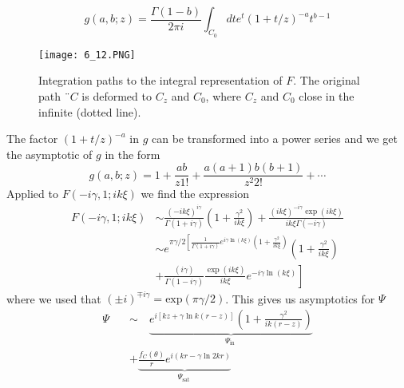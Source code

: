 \begin{equation}
    g(a, b ; z)=\frac{\Gamma(1-b)}{2 \pi i} \int_{C_{0}} d t e^{t}(1+t / z)^{-a} t^{b-1}
    \end{equation}
\begin{figure}[ht]
    \begin{minipage}{0.6\textwidth}
        \centering
        \texttt{[image: 6\_12.PNG]}
    \end{minipage}
    \begin{minipage}{0.4\textwidth}
        \caption{Integration paths to the integral representation of $F$. The original path ¨$C$ is deformed to $C_z$ and $C_0$, where $C_z$ and $C_0$ close in the infinite (dotted line).}
    \end{minipage}
\end{figure}
The factor $(1 + t / z)^{-a}$ in $g$ can be transformed into a power series and we get the asymptotic of $g$ in the form
\begin{equation}
    g(a, b ; z)=1+\frac{a b}{z 1 !}+\frac{a(a+1) b(b+1)}{z^{2} 2 !}+\cdots
    \end{equation}
Applied to $F (-i\gamma, 1; ik\xi)$ we find the expression
\begin{equation}
\begin{aligned} 
F(-i \gamma, 1 ; i k \xi) &\sim  \frac{(-i k \xi)^{i \gamma}}{\Gamma(1+i \gamma)}\left(1+\frac{\gamma^{2}}{i k \xi}\right)+\frac{(i k \xi)^{-i \gamma} \exp (i k \xi)}{i k \xi \Gamma(-i \gamma)} \\ 
&\sim e^{\pi \gamma / 2\left[\frac{1}{\Gamma(1+i \gamma)} e^{i \gamma \ln (k \xi)}\left(1+\frac{\gamma^{2}}{i k \xi}\right)\right.} \left(1+\frac{\gamma^{2}}{i k \xi}\right) \\
&\left.+\frac{(i \gamma)}{\Gamma(1-i \gamma)} \frac{\exp (i k \xi)}{i k \xi} e^{-i \gamma \ln (k \xi)}\right] \end{aligned}
\end{equation}
where we used that $(\pm i)^{\mp i\gamma} = \text{exp} (\pi\gamma / 2)$. This gives us asymptotics for $\Psi$
\begin{equation}
\begin{aligned} \Psi \quad &\sim \quad \underbrace{e^{i[k z+\gamma \ln k(r-z)]}\left(1+\frac{\gamma^{2}}{i k(r-z)}\right)}_{\Psi_{\text {in }}} \\
&+\underbrace{\frac{f_{C}(\theta)}{r} e^{i(k r-\gamma \ln 2 k r)}}_{\Psi_{\text {sat }}} \end{aligned}
\end{equation}
